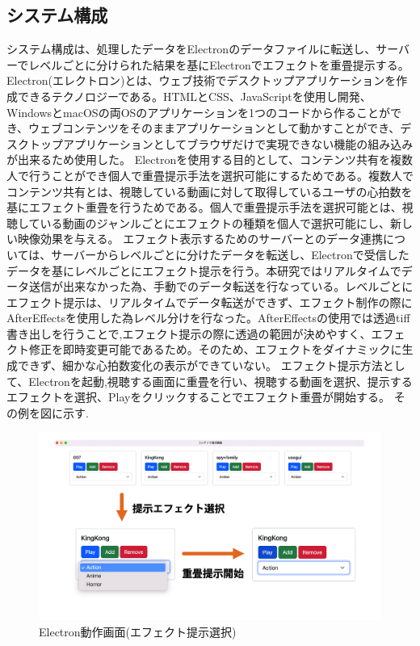 \subsection{システム構成}
システム構成は、処理したデータをElectronのデータファイルに転送し、サーバーでレベルごとに分けられた結果を基にElectronでエフェクトを重畳提示する。
Electron(エレクトロン)とは、ウェブ技術でデスクトップアプリケーションを作成できるテクノロジーである。HTMLとCSS、JavaScriptを使用し開発、WindowsとmacOSの両OSのアプリケーションを1つのコードから作ることができ、ウェブコンテンツをそのままアプリケーションとして動かすことができ、デスクトップアプリケーションとしてブラウザだけで実現できない機能の組み込みが出来るため使用した。
Electronを使用する目的として、コンテンツ共有を複数人で行うことができ個人で重畳提示手法を選択可能にするためである。複数人でコンテンツ共有とは、視聴している動画に対して取得しているユーザの心拍数を基にエフェクト重畳を行うためである。個人で重畳提示手法を選択可能とは、視聴している動画のジャンルごとにエフェクトの種類を個人で選択可能にし、新しい映像効果を与える。
エフェクト表示するためのサーバーとのデータ連携については、サーバーからレベルごとに分けたデータを転送し、Electronで受信したデータを基にレベルごとにエフェクト提示を行う。本研究ではリアルタイムでデータ送信が出来なかった為、手動でのデータ転送を行なっている。レベルごとにエフェクト提示は、リアルタイムでデータ転送ができず、エフェクト制作の際にAfterEffectsを使用した為レベル分けを行なった。AfterEffectsの使用では透過tiff書き出しを行うことで,エフェクト提示の際に透過の範囲が決めやすく、エフェクト修正を即時変更可能であるため。そのため、エフェクトをダイナミックに生成できず、細かな心拍数変化の表示ができていない。
エフェクト提示方法として、Electronを起動,視聴する画面に重畳を行い、視聴する動画を選択、提示するエフェクトを選択、Playをクリックすることでエフェクト重畳が開始する。
その例を図に示す.

\begin{figure}[H]
    \centering
    \includegraphics[width=15cm]{images/chapter3/efect_setumei.png}
    \caption{Electron動作画面(エフェクト提示選択)}
\end{figure}

